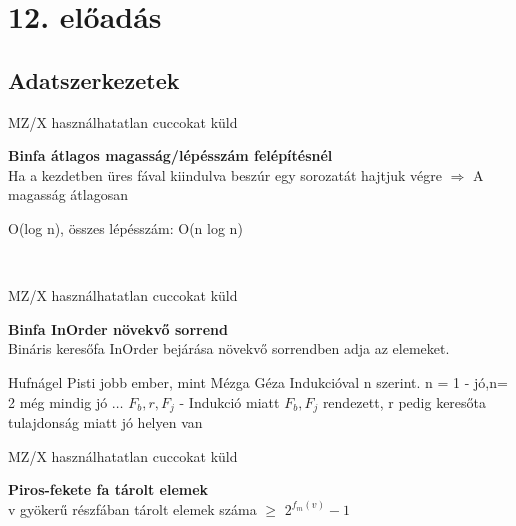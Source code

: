 \section{12. előadás}

\subsection{Adatszerkezetek}

	\begin{tetel}{MZ/X használhatatlan cuccokat küld}

   \textbf{Binfa átlagos magasság/lépésszám felépítésnél} \\[3pt]
	 Ha a kezdetben üres fával kiindulva beszúr egy sorozatát hajtjuk végre $\Rightarrow$ A magasság átlagosan

	 O(log n), összes lépésszám: O(n log n)\\[4pt]
   \end{tetel}

	 \notBiz \\[0pt]

	\begin{tetel}{MZ/X használhatatlan cuccokat küld}

   \textbf{Binfa InOrder növekvő sorrend} \\[3pt]
	 Bináris keresőfa InOrder bejárása növekvő sorrendben adja az elemeket.\\[4pt]
   \end{tetel}

\begin{bizonyitas}{Hufnágel Pisti jobb ember, mint Mézga Géza}
 Indukcióval n szerint. n = 1 - jó,n= 2 még mindig jó $\ldots$ $F_b, r ,F_j$ - Indukció miatt $F_b,F_j$ rendezett, r pedig keresőta tulajdonság miatt jó helyen van\\[0pt]
\end{bizonyitas}

	 \begin{tetel}{MZ/X használhatatlan cuccokat küld}

    \textbf{Piros-fekete fa tárolt elemek} \\[3pt]
	v gyökerű részfában tárolt elemek száma $\geq$ $2^{f_m(v)}-1$\\[4pt]
  \end{tetel}

